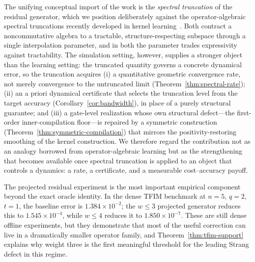 \documentclass[aps,prresearch,reprint,superscriptaddress,nofootinbib,amsmath,amssymb]{revtex4-2}
\newcommand{\tfim}{TFIM}
\begin{document}
The unifying conceptual import of the work is the \emph{spectral truncation} of the residual generator, which we position deliberately against the operator-algebraic spectral truncations recently developed in kernel learning~\cite{hashimoto2024spectral,hashimoto2023rkhm}. Both contract a noncommutative algebra to a tractable, structure-respecting subspace through a single interpolation parameter, and in both the parameter trades expressivity against tractability. The simulation setting, however, supplies a stronger object than the learning setting: the truncated quantity governs a concrete dynamical error, so the truncation acquires (i) a quantitative geometric convergence rate, not merely convergence to the untruncated limit (Theorem~\ref{thm:spectral-rate}); (ii) an a priori dynamical certificate that selects the truncation level from the target accuracy (Corollary~\ref{cor:bandwidth}), in place of a purely structural guarantee; and (iii) a gate-level realization whose own structural defect---the first-order inner-compilation floor---is repaired by a symmetric construction (Theorem~\ref{thm:symmetric-compilation}) that mirrors the positivity-restoring smoothing of the kernel construction. We therefore regard the contribution not as an analogy borrowed from operator-algebraic learning but as the strengthening that becomes available once spectral truncation is applied to an object that controls a dynamics: a rate, a certificate, and a measurable cost--accuracy payoff.

The projected residual experiment is the most important empirical component beyond the exact oracle identity. In the dense \tfim{} benchmark at $n=5$, $q=2$, $t=1$, the baseline error is $1.384\times10^{-2}$; the $w\leq3$ projected generator reduces this to $1.545\times10^{-4}$, while $w\leq4$ reduces it to $1.850\times10^{-7}$. These are still dense offline experiments, but they demonstrate that most of the useful correction can live in a dramatically smaller operator family, and Theorem~\ref{thm:tfim-support} explains why weight three is the first meaningful threshold for the leading Strang defect in this regime.
\end{document}
